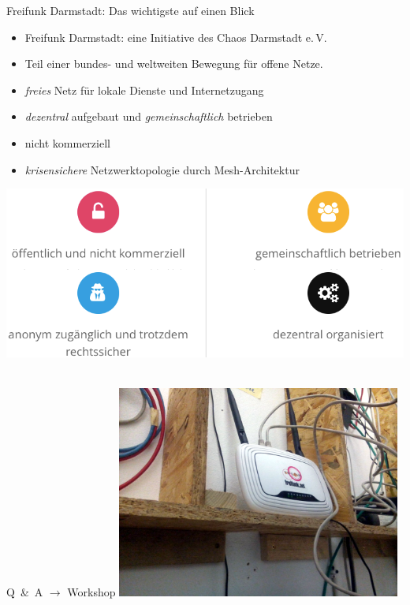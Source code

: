 \documentclass[10pt]{beamer}
\begin{document}
    \begin{frame}{Freifunk Darmstadt: Das wichtigste auf einen Blick}
      \begin{centering}
      \begin{itemize}
        \item Freifunk Darmstadt: eine Initiative des Chaos Darmstadt e.\,V.
        \item Teil einer bundes- und weltweiten Bewegung für offene Netze.
        \item \emph{freies} Netz für lokale Dienste und Internetzugang
        \item \emph{dezentral} aufgebaut und \emph{gemeinschaftlich} betrieben
        \item nicht kommerziell
        \item \emph{krisensichere} Netzwerktopologie durch Mesh-Architektur
      \end{itemize}
      \includegraphics[width=1.0\textheight]{images/principles}$\;$
      \end{centering}
    \end{frame}

    \begin{frame}{Q~\&~A $\rightarrow$ Workshop}
      \vfill
      \centering
      \includegraphics[width=0.7\textwidth]{images/irl_router}
      \vfill
    \end{frame}
\end{document}

